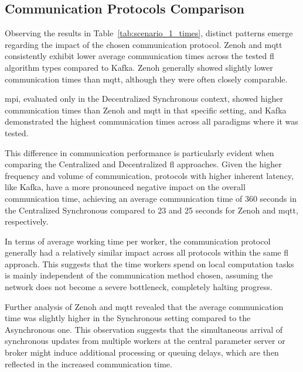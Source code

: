 \subsection{Communication Protocols Comparison}
\label{sec:communication-protocols-comparison}

Observing the results in Table~\ref{tab:scenario_1_times}, distinct patterns emerge regarding the impact of the chosen communication protocol. Zenoh and \ac{mqtt} consistently exhibit lower average communication times across the tested \ac{fl} algorithm types compared to Kafka. Zenoh generally showed slightly lower communication times than \ac{mqtt}, although they were often closely comparable. 

\ac{mpi}, evaluated only in the Decentralized Synchronous context, showed higher communication times than Zenoh and \ac{mqtt} in that specific setting, and Kafka demonstrated the highest communication times across all paradigms where it was tested.

This difference in communication performance is particularly evident when comparing the Centralized and Decentralized \ac{fl} approaches. Given the higher frequency and volume of communication, protocols with higher inherent latency, like Kafka, have a more pronounced negative impact on the overall communication time, achieving an average communication time of 360 seconds in the Centralized Synchronous compared to 23 and 25 seconds for Zenoh and \ac{mqtt}, respectively. 

In terms of average working time per worker, the communication protocol generally had a relatively similar impact across all protocols within the same \ac{fl} approach. This suggests that the time workers spend on local computation tasks is mainly independent of the communication method chosen, assuming the network does not become a severe bottleneck, completely halting progress. 

Further analysis of Zenoh and \ac{mqtt} revealed that the average communication time was slightly higher in the Synchronous setting compared to the Asynchronous one. This observation suggests that the simultaneous arrival of synchronous updates from multiple workers at the central parameter server or broker might induce additional processing or queuing delays, which are then reflected in the increased communication time.

